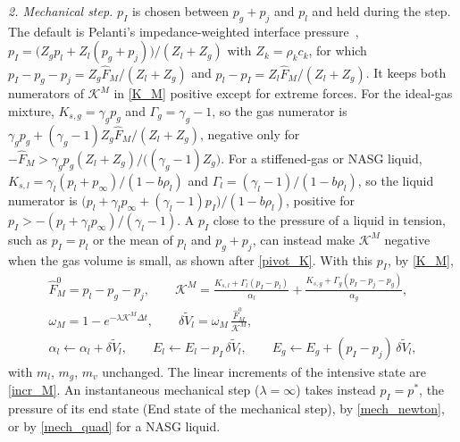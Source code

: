 \emph{2. Mechanical step.} $p_I$ is chosen between $p_g+p_{j}$ and $p_l$ and held during the step. The default is Pelanti's impedance-weighted interface pressure~\cite{Pelanti2022}, $p_I=\bigl(Z_gp_l+Z_l(p_g+p_{j})\bigr)/(Z_l+Z_g)$ with $Z_k=\rho_kc_k$, for which $p_I-p_g-p_{j}=Z_g\hat{F}_M/(Z_l+Z_g)$ and $p_l-p_I=Z_l\hat{F}_M/(Z_l+Z_g)$. It keeps both numerators of $\mathcal{K}^M$ in \eqref{K_M} positive except for extreme forces. For the ideal-gas mixture, $K_{s,g}=\gamma_gp_g$ and $\Gamma_g=\gamma_g-1$, so the gas numerator is $\gamma_gp_g+(\gamma_g-1)Z_g\hat{F}_M/(Z_l+Z_g)$, negative only for $-\hat{F}_M>\gamma_gp_g(Z_l+Z_g)/\bigl((\gamma_g-1)Z_g\bigr)$. For a stiffened-gas or NASG liquid, $K_{s,l}=\gamma_l(p_l+p_\infty)/(1-b\rho_l)$ and $\Gamma_l=(\gamma_l-1)/(1-b\rho_l)$, so the liquid numerator is $\bigl(p_l+\gamma_lp_\infty+(\gamma_l-1)p_I\bigr)/(1-b\rho_l)$, positive for $p_I>-(p_l+\gamma_lp_\infty)/(\gamma_l-1)$. A $p_I$ close to the pressure of a liquid in tension, such as $p_I=p_l$ or the mean of $p_l$ and $p_g+p_{j}$, can instead make $\mathcal{K}^M$ negative when the gas volume is small, as shown after \eqref{pivot_K}. With this $p_I$, by \eqref{K_M},
\begin{equation}\label{alg_M}
\begin{gathered}
\hat{F}_M^0=p_l-p_g-p_{j},\qquad \mathcal{K}^M=\frac{K_{s,l}+\Gamma_l(p_I-p_l)}{\alpha_l}+\frac{K_{s,g}+\Gamma_g(p_I-p_{j}-p_g)}{\alpha_g},\\
\omega_M=1-e^{-\lambda\mathcal{K}^M\Delta t},\qquad \delta\tilde{V}_l=\omega_M\,\frac{\hat{F}_M^0}{\mathcal{K}^M},\\
\alpha_l\leftarrow\alpha_l+\delta\tilde{V}_l,\qquad E_l\leftarrow E_l-p_I\,\delta\tilde{V}_l,\qquad E_g\leftarrow E_g+(p_I-p_{j})\,\delta\tilde{V}_l,
\end{gathered}
\end{equation}
with $m_l$, $m_g$, $m_v$ unchanged. The linear increments of the intensive state are \eqref{incr_M}. An instantaneous mechanical step ($\lambda=\infty$) takes instead $p_I=p^*$, the pressure of its end state (End state of the mechanical step), by \eqref{mech_newton}, or by \eqref{mech_quad} for a NASG liquid.

